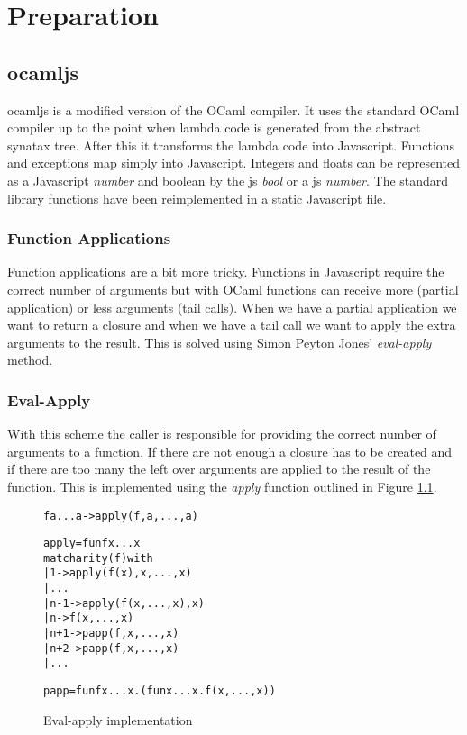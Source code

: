\chapter{Preparation}

\section{ocamljs}
ocamljs is a modified version of the OCaml compiler. It uses the standard OCaml compiler up to the point when lambda code is generated from the abstract synatax tree. After this it transforms the lambda code into Javascript. Functions and exceptions map simply into Javascript. Integers and floats can be represented as a Javascript \emph{number} and boolean by the js \emph{bool} or a js \emph{number}. The standard library functions have been reimplemented in a static Javascript file.

\subsection{Function Applications}
Function applications are a bit more tricky. Functions in Javascript require the correct number of arguments but with OCaml functions can receive more (partial application) or less arguments (tail calls). When we have a partial application we want to return a closure and when we have a tail call we want to apply the extra arguments to the result. This is solved using Simon Peyton Jones' \emph{eval-apply} method.

\subsection{Eval-Apply}
With this scheme the caller is responsible for providing the correct number of arguments to a function. If there are not enough a closure has to be created and if there are too many the left over arguments are applied to the result of the function. This is implemented using the \emph{apply} function outlined in Figure \ref{eval-apply}.

\begin{figure}
  \begin{alltt}
% fun = lambda... work out how to do this later %
f a ... a -> apply(f, a, ..., a)

apply = fun f x ... x
  match arity(f) with
    | 1   -> apply (f(x), x, ..., x)
    | ...
    | n-1 -> apply (f(x, ..., x), x)
    | n   -> f(x, ..., x)
    | n+1 -> papp(f, x, ..., x)
    | n+2 -> papp(f, x, ..., x)
    | ...

papp = fun f x ... x. (fun x ... x. f(x, ..., x))
  \end{alltt}
  \caption{Eval-apply implementation}
  \label{eval-apply}
\end{figure}

